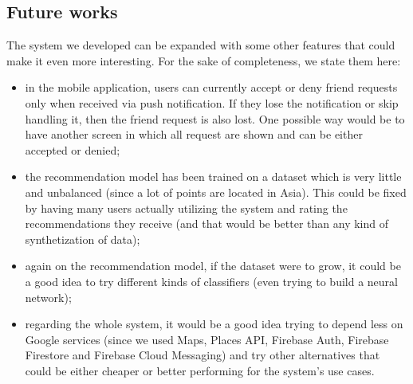 \documentclass[../../main]{subfiles}
\begin{document}
\label{ss:future-works}
\subsection{Future works}

The system we developed can be expanded with some other features that could make it even more interesting. For the sake of completeness, we state them here:
\begin{itemize}
    \item in the mobile application, users can currently accept or deny friend requests only when received via push notification. 
    If they lose the notification or skip handling it, then the friend request is also lost.
    One possible way would be to have another screen in which all request are shown and can be either accepted or denied;
    \item the recommendation model has been trained on a dataset which is very little and unbalanced (since a lot of points are located in Asia).
    This could be fixed by having many users actually utilizing the system and rating the recommendations they receive (and that would be better than any kind of synthetization of data);
    \item again on the recommendation model, if the dataset were to grow, it could be a good idea to try different kinds of classifiers (even trying to build a neural network);
    \item regarding the whole system, it would be a good idea trying to depend less on Google services (since we used Maps, Places API, Firebase Auth, Firebase Firestore and Firebase Cloud Messaging) and try other alternatives that could be either cheaper or better performing for the system's use cases.
\end{itemize}
\end{document}
